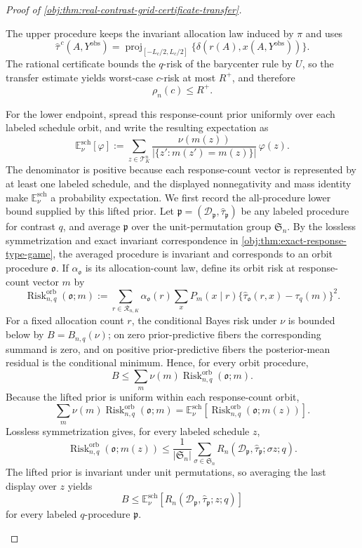 \documentclass[11pt]{article}
\begin{document}
\begin{proof}[Proof of \cref{obj:thm:real-contrast-grid-certificate-transfer}]
\begin{enumerate}
The upper procedure keeps the invariant allocation law induced by \(\pi\) and uses
\[
\widehat\tau^{\,c}(A,Y^{\mathrm{obs}})
=
\operatorname{proj}_{[-L_c/2,L_c/2]}
\{\delta(r(A),x(A,Y^{\mathrm{obs}}))\}.
\]
The rational certificate bounds the \(q\)-risk of the barycenter rule by \(U\), so the transfer estimate yields worst-case \(c\)-risk at most \(R^+\), and therefore
\[
\rho_n(c)\le R^+ .
\]

For the lower endpoint, spread this response-count prior uniformly over each labeled schedule orbit, and write the resulting expectation as
\[
\mathbb E^{\mathrm{sch}}_{\nu}[\varphi]
:=
\sum_{z\in\mathcal T_K^n}
\frac{\nu(m(z))}{|\{z':m(z')=m(z)\}|}\,\varphi(z).
\]
The denominator is positive because each response-count vector is represented by at least one labeled schedule, and the displayed nonnegativity and mass identity make \(\mathbb E^{\mathrm{sch}}_{\nu}\) a probability expectation.  We first record the all-procedure lower bound supplied by this lifted prior.  Let \(\mathfrak p=(\mathcal D_{\mathfrak p},\widehat\tau_{\mathfrak p})\) be any labeled procedure for contrast \(q\), and average \(\mathfrak p\) over the unit-permutation group \(\mathfrak S_n\).  By the lossless symmetrization and exact invariant correspondence in \cref{obj:thm:exact-response-type-game}, the averaged procedure is invariant and corresponds to an orbit procedure \(\mathfrak o\).  If \(\alpha_{\mathfrak o}\) is its allocation-count law, define its orbit risk at response-count vector \(m\) by
\[
\operatorname{Risk}^{\mathrm{orb}}_{n,q}(\mathfrak o;m)
:=
\sum_{r\in\mathcal R_{n,K}}\alpha_{\mathfrak o}(r)
\sum_x P_m(x\mid r)
\{\widehat\tau_{\mathfrak o}(r,x)-\tau_q(m)\}^2 .
\]
For a fixed allocation count \(r\), the conditional Bayes risk under \(\nu\) is bounded below by \(B=B_{n,q}(\nu)\); on zero prior-predictive fibers the corresponding summand is zero, and on positive prior-predictive fibers the posterior-mean residual is the conditional minimum.  Hence, for every orbit procedure,
\[
B
\le
\sum_{m}\nu(m)\operatorname{Risk}^{\mathrm{orb}}_{n,q}(\mathfrak o;m).
\]
Because the lifted prior is uniform within each response-count orbit,
\[
\sum_m\nu(m)\operatorname{Risk}^{\mathrm{orb}}_{n,q}(\mathfrak o;m)
=
\mathbb E^{\mathrm{sch}}_{\nu}
\left[\operatorname{Risk}^{\mathrm{orb}}_{n,q}(\mathfrak o;m(z))\right].
\]
Lossless symmetrization gives, for every labeled schedule \(z\),
\[
\operatorname{Risk}^{\mathrm{orb}}_{n,q}(\mathfrak o;m(z))
\le
\frac1{|\mathfrak S_n|}
\sum_{\sigma\in\mathfrak S_n}
R_n(\mathcal D_{\mathfrak p},\widehat\tau_{\mathfrak p};\sigma z;q).
\]
The lifted prior is invariant under unit permutations, so averaging the last display over \(z\) yields
\[
B
\le
\mathbb E^{\mathrm{sch}}_{\nu}
\left[R_n(\mathcal D_{\mathfrak p},\widehat\tau_{\mathfrak p};z;q)\right]
\]
for every labeled \(q\)-procedure \(\mathfrak p\).


\end{enumerate}
\end{proof}
\end{document}
